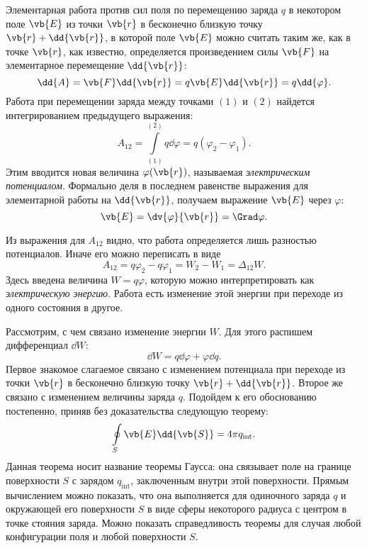 \documentclass[\docroot/reports/lectures-draft/report.tex]{subfiles}
\begin{document}
    Элементарная работа против сил поля по перемещению заряда $q$ в некотором поле $\vb{E}$ из точки $\vb{r}$ в бесконечно близкую точку $\vb{r} + \dd{\vb{r}}$, в которой поле $\vb{E}$ можно считать таким же, как в точке $\vb{r}$, как известно, определяется произведением силы $\vb{F}$ на элементарное перемещение $\dd{\vb{r}}$:
    \begin{equation*}
        \dd{A} = \vb{F} \dd{\vb{r}} = q \vb{E} \dd{\vb{r}} = q \dd{\varphi} .
    \end{equation*}
    Работа при перемещении заряда между точками $(1)$ и $(2)$ найдется интегрированием предыдущего выражения:
    \begin{equation*}
        A_{12} = \int\limits_{(1)}^{(2)} q \dd{\varphi} = q (\varphi_2 - \varphi_1) .
    \end{equation*}
    Этим вводится новая величина $\varphi(\vb{r})$, называемая \textit{электрическим потенциалом}. Формально деля в последнем равенстве выражения для элементарной работы на $\dd{\vb{r}}$, получаем выражение $\vb{E}$ через $\varphi$:
    \begin{equation*}
        \vb{E} = \dv{\varphi}{\vb{r}} = \Grad \varphi .
    \end{equation*}

    Из выражения для $A_{12}$ видно, что работа определяется лишь разностью потенциалов. Иначе его можно переписать в виде
    \begin{equation*}
        A_{12} = q \varphi_2 - q \varphi_1 = W_2 - W_1 = \Delta_{12} W .
    \end{equation*}
    Здесь введена величина $W = q \varphi$, которую можно интерпретировать как \textit{электрическую энергию}. Работа есть изменение этой энергии при переходе из одного состояния в другое.

    Рассмотрим, с чем связано изменение энергии $W$. Для этого распишем дифференциал $\dd{W}$:
    \begin{equation*}
        \dd{W} = q \dd{\varphi} + \varphi \dd{q} .
    \end{equation*}
    Первое знакомое слагаемое связано с изменением потенциала при переходе из точки $\vb{r}$ в бесконечно близкую точку $\vb{r} + \dd{\vb{r}}$. Второе же связано с изменением величины заряда $q$. Подойдем к его обоснованию постепенно, приняв без доказательства следующую теорему:
    \begin{equation*}
        \oint\limits_S \vb{E} \dd{\vb{S}} = 4 \pi q_\text{int} .
    \end{equation*}
    Данная теорема носит название теоремы Гаусса: она связывает поле на границе поверхности $S$ с зарядом $q_\text{int}$, заключенным внутри этой поверхности. Прямым вычислением можно показать, что она выполняется для одиночного заряда $q$ и окружающей его поверхности $S$ в виде сферы некоторого радиуса с центром в точке стояния заряда. Можно показать справедливость теоремы для случая любой конфигурации поля и любой поверхности $S$.
\end{document}
